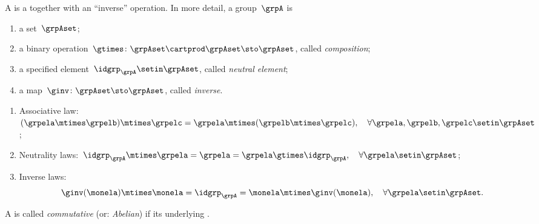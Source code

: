 \begin{ctdefinition}[Group]
    \label{def:group}
    A  is a  together with an ``inverse'' operation.
    In more detail, a group~$\grpA$ is
    \begin{body}
        \constit
        \begin{enumerate}
            \item a set~$\grpAset$;
            \item a binary operation~$\gtimes \colon \grpAset \cartprod \grpAset \sto \grpAset$, called \emph{composition};
            \item a specified element~$\idgrp_\grpA \setin \grpAset$, called \emph{neutral element};
            \item a map~$\ginv\colon \grpAset \sto \grpAset$, called \emph{inverse}.
        \end{enumerate}
        \condit
        \begin{enumerate}
            \item Associative law:~$(\grpela\mtimes \grpelb)\mtimes \grpelc=\grpela\mtimes (\grpelb\mtimes \grpelc), \quad \forall  \grpela, \grpelb, \grpelc \setin \grpAset$;
            \item Neutrality laws:~$\idgrp_\grpA \mtimes \grpela=\grpela=\grpela \gtimes \idgrp_\grpA, \quad \forall  \grpela \setin \grpAset$;
            \item Inverse laws:
                  \begin{equation}
                      \label{eq:group-inverse-law}
                      \ginv(\monela) \mtimes \monela = \idgrp_\grpA = \monela \mtimes \ginv(\monela), \quad \forall  \grpela  \setin \grpAset.
                  \end{equation}
        \end{enumerate}
    \end{body}
\end{ctdefinition}

\begin{marginfigure}
    \centering
    \caption{Group Diagram}
    \label{fig:group-diagram}
\end{marginfigure}


\begin{ctdefinition}\label{def:commutative-group}
    A  is called \emph{commutative} (or: \emph{Abelian}) if its underlying .
\end{ctdefinition}


